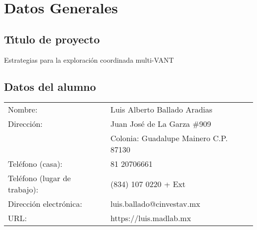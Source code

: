 \documentclass[11pt,epsf,times]{article}
\begin{document}
\begin{abstract}

  
  
\end{abstract}

\newpage
\section{Datos Generales}

\subsection{T\'{\i}tulo de proyecto}
Estrategias para la exploraci\'{o}n coordinada multi-VANT

\subsection{Datos del alumno}
\begin{tabular}{ll} 
Nombre:  &          Luis Alberto Ballado Aradias \\
Direcci\'{o}n:   & Juan José de La Garza \#909\\
                 & Colonia: Guadalupe Mainero C.P. 87130\\
Tel\'{e}fono (casa):    & 81 20706661 \\
Tel\'{e}fono (lugar de trabajo):    & (834) 107 0220 + Ext  \\
Direcci\'{o}n electr\'{o}nica: & luis.ballado@cinvestav.mx \\
URL: & https://luis.madlab.mx
\end{tabular}
\end{document}
